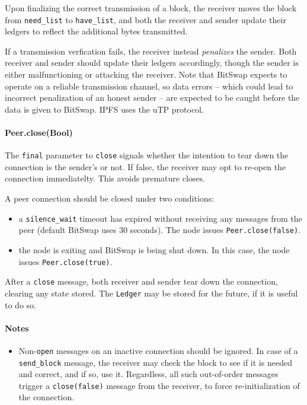 \documentclass{sig-alternate}
\begin{document}
Upon finalizing the correct transmission of a block, the receiver moves the
block from \texttt{need\_list} to \texttt{have\_list}, and both the receiver
and sender update their ledgers to reflect the additional bytes transmitted.

If a transmission verfication fails, the receiver instead \textit{penalizes}
the sender. Both receiver and sender should update their ledgers accordingly,
though the sender is either malfunctioning or attacking the receiver. Note that
BitSwap expects to operate on a reliable transmission channel, so data errors
-- which could lead to incorrect penalization of an honest sender -- are
expected to be caught before the data is given to BitSwap. IPFS uses the uTP
protocol.

\paragraph{Peer.close(Bool)}

The \texttt{final} parameter to \texttt{close} signals whether the intention
to tear down the connection is the sender's or not. If false, the receiver
may opt to re-open the connection immediatelty. This avoids premature
closes.

A peer connection should be closed under two conditions:
\begin{itemize}
  \item a \texttt{silence\_wait} timeout has expired without receiving any
        messages from the peer (default BitSwap uses 30 seconds).
        The node issues \texttt{Peer.close(false)}.
  \item the node is exiting and BitSwap is being shut down.
        In this case, the node issues \texttt{Peer.close(true)}.
\end{itemize}

After a \texttt{close} message, both receiver and sender tear down the
connection, clearing any state stored. The \texttt{Ledger} may be stored for
the future, if it is useful to do so.

\paragraph{Notes}

\begin{itemize}
  \item Non-\texttt{open} messages on an inactive connection should be ignored.
        In case of a \texttt{send\_block} message, the receiver may check
        the block to see if it is needed and correct, and if so, use it.
        Regardless, all such out-of-order messages trigger a
        \texttt{close(false)} message from the receiver, to force
        re-initialization of the connection.
\end{itemize}
\end{document}
